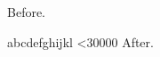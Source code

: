 \documentclass{article}
\def\row{\hbox{a}\hbox{b}\hbox{c}\hbox{d}\hbox{e}\hbox{f}\hbox{g}\hbox{h}\hbox{i}\hbox{j}\hbox{k}\hbox{l}}
\begin{document}
Before.\par
\loop\row\advance{} \ifnum\n<30000 \repeat
After.
\end{document}
